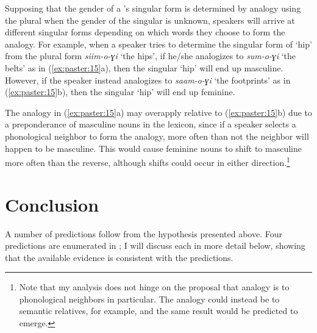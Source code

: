 \documentclass[output=paper,modfonts]{langscibook}
\begin{document}
Supposing that the gender of a ’s singular form is determined by analogy using the plural when the gender of the singular  is unknown, speakers will arrive at different singular forms depending on which words they choose to form the analogy. For example, when a speaker tries to determine the singular form of ‘hip’ from the plural form \textit{siim-o-ɣi} ‘the hips’, if he/she analogizes to \textit{sum-o-ɣi} ‘the belts’ as in (\ref{ex:paster:15}a), then the singular ‘hip’ will end up masculine. However, if the speaker instead analogizes to \textit{saam-o-ɣi} ‘the footprints’ as in (\ref{ex:paster:15}b), then the singular ‘hip’ will end up feminine.




The analogy in (\ref{ex:paster:15}a) may overapply relative to (\ref{ex:paster:15}b) due to a preponderance of masculine nouns in the lexicon, since if a speaker selects a phonological neighbor to form the analogy, more often than not the neighbor will happen to be masculine. This would cause feminine nouns to shift to masculine more often than the reverse, although shifts could occur in either direction.\footnote{Note that my analysis does not hinge on the proposal that analogy is to phonological neighbors in particular. The analogy could instead be to semantic relatives, for example, and the same result would be predicted to emerge.}

\section{Conclusion}\label{sec:paster:6}

A number of predictions follow from the hypothesis presented above. Four predictions are enumerated in ; I will discuss each in more detail below, showing that the available evidence is consistent with the predictions.
\end{document}
